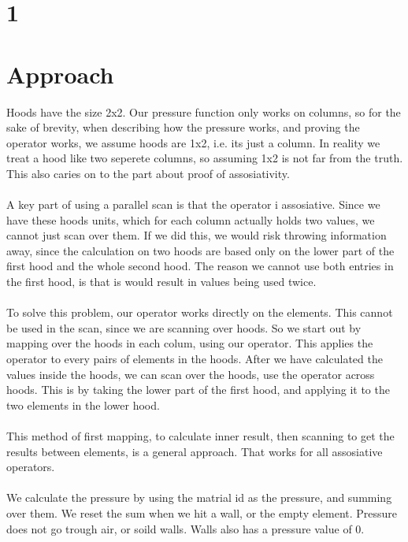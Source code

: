 \documentclass[11pt]{report}
\begin{document}
\pagestyle{fancy}
\setlength{\parindent}{0pt}


\section{1}


\section{Approach}
Hoods have the size 2x2. Our pressure function only works on columns, so for the sake of brevity, when describing how the pressure works, and proving the operator works, we assume hoods are 1x2, i.e. its just a column. In reality we treat a hood like two seperete columns, so assuming 1x2 is not far from the truth. This also caries on to the part about proof of assosiativity.
\\
\\
A key part of using a parallel scan is that the operator i assosiative. Since we have these hoods units, which for each column actually holds two values, we cannot just scan over them. If we did this, we would risk throwing information away, since the calculation on two hoods are based only on the lower part of the first hood and the whole second hood. The reason we cannot use both entries in the first hood, is that is would result in values being used twice.
\\
\\
To solve this problem, our operator works directly on the elements. This cannot be used in the scan, since we are scanning over hoods. So we start out by mapping over the hoods in each colum, using our operator. This applies the operator to every pairs of elements in the hoods. After we have calculated the values inside the hoods, we can scan over the hoods, use the operator across hoods. This is by taking the lower part of the first hood, and applying it to the two elements in the lower hood.
\\
\\
This method of first mapping, to calculate inner result, then scanning to get the results between elements, is a general approach. That works for all assosiative operators.
\\
\\
We calculate the pressure by using the matrial id as the pressure, and summing over them. We reset the sum when we hit a wall, or the empty element. Pressure does not go trough air, or soild walls. Walls also has a pressure value of 0.
\end{document}
